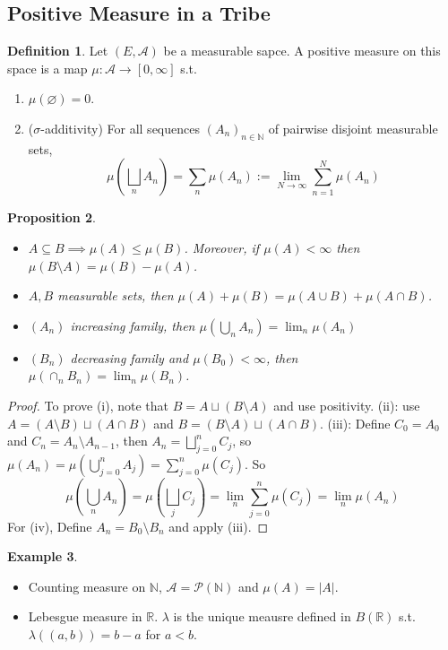 \documentclass{article}
\theoremstyle{definition}
\newtheorem{defn}{Definition}[section]
\newtheorem{example}[defn]{Example}
\theoremstyle{remark}
\theoremstyle{plain}
\newtheorem{prop}[defn]{Proposition}
\newcommand{\NN}{\mathbb{N}}
\newcommand{\RR}{\mathbb{R}}
\begin{document}
\subsection{Positive Measure in a Tribe}
\begin{defn}
    Let $(E,\mathcal{A})$ be a measurable sapce. A positive measure on this space is a map $\mu:\mathcal{A}\to[0,\infty]$ s.t.
    \begin{enumerate}
        \item $\mu(\varnothing)=0$.
        \item ($\sigma$-additivity) For all sequences $(A_n)_{n\in \NN}$ of pairwise disjoint measurable sets, $$\mu(\bigsqcup_n A_n)=\sum_n\mu(A_n):=\lim_{N\to\infty}\sum_{n=1}^N\mu(A_n)$$
    \end{enumerate}
\end{defn}
\begin{prop}
    \begin{itemize}
        \item $A\subseteq B\implies\mu(A)\le\mu(B)$. Moreover, if $\mu(A)<\infty$ then $\mu(B\setminus A)=\mu(B)-\mu(A)$.
        \item $A,B$ measurable sets, then $\mu(A)+\mu(B)=\mu(A\cup B)+\mu(A\cap B)$.
        \item $(A_n)$ increasing family, then $\mu(\bigcup_nA_n)=\lim_n\mu(A_n)$
        \item $(B_n)$ decreasing family and $\mu(B_0)<\infty$, then $\mu(\cap_nB_n)=\lim_n\mu(B_n)$.
    \end{itemize}
\end{prop}
\begin{proof}
    To prove (i), note that $B=A\sqcup (B\setminus A)$ and use positivity. (ii): use $A=(A\setminus B)\sqcup (A\cap B)$ and $B=(B\setminus A)\sqcup(A\cap B)$. (iii): Define $C_0=A_0$ and $C_n=A_n\setminus A_{n-1}$, then $A_n=\bigsqcup_{j=0}^n C_j$, so $\mu(A_n)=\mu(\bigcup_{j=0}^nA_j)=\sum_{j=0}^n\mu(C_j)$. So
    \[\mu(\bigcup_n A_n)=\mu(\bigsqcup_j C_j)=\lim_n\sum_{j=0}^n\mu(C_j)=\lim_n\mu(A_n)\]
    For (iv), Define $A_n=B_0\setminus B_n$ and apply (iii).
\end{proof}
\begin{example}
\begin{itemize}
    \item Counting measure on $\NN$, $\mathcal{A}=\mathcal{P}(\NN)$ and $\mu(A)=|A|$.
    \item Lebesgue measure in $\RR$. $\lambda$ is the unique meausre defined in $B(\RR)$ s.t. $\lambda((a,b))=b-a$ for $a<b$.
\end{itemize}
\end{example}
\end{document}
